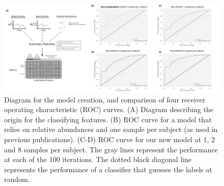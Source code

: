 \begin{figure}
\includegraphics[width=0.95\textheight]{ibd-figures/figure-1}
\caption[Diagram for the model creation, and comparison of four receiver operating characteristic (ROC) curves.]{Diagram for the model creation, and comparison of four receiver operating characteristic (ROC) curves. (A) Diagram describing the origin for the classifying features. (B) ROC curve for a model that relies on relative abundances and one sample per subject (as used in previous publications). (C-D) ROC curve for our new model at 1, 2 and 8 samples per subject. The gray lines represent the performance at each of the 100 iterations. The dotted black diagonal line represents the performance of a classifier that guesses the labels at random.}\label{ibd-fig1}
\end{figure}

